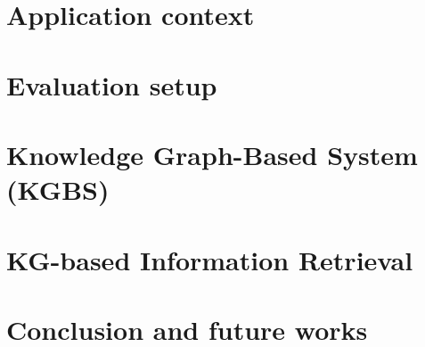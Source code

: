     \section[Context]{Application context}
    

    
    
    \section[Evaluation]{Evaluation setup}
    
    
    \section[KG-based system]{Knowledge Graph-Based System (KGBS)}
    
    
    \section[KG-based IR]{KG-based Information Retrieval}
    
    
    \section[Conclusion]{Conclusion and future works}
    
    
    
    
    \miniframesoff
    

